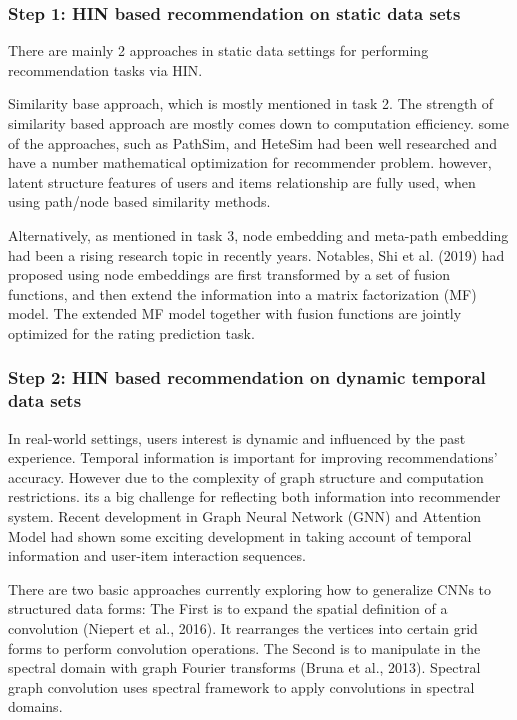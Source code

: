 \documentclass[12pt,a4 paper,title page]{article}
\begin{document}
\subsubsection*{Step 1: HIN based recommendation on static data sets}
There are mainly 2 approaches in static data settings for performing recommendation tasks via HIN. 

Similarity base approach, which is mostly mentioned in task 2. The strength of similarity based approach are mostly comes down to computation efficiency. some of the approaches, such as PathSim, and HeteSim had been well researched and have a number mathematical optimization for recommender problem. however, latent structure features of users and items relationship are fully used, when using path/node based similarity methods.

Alternatively, as mentioned in task 3, node embedding and meta-path embedding had been a rising research topic in recently years. Notables, Shi et al. (2019) had proposed using node embeddings are first transformed by a set of fusion functions, and then extend the information into a matrix factorization (MF) model. The extended MF model together with fusion functions are jointly optimized for the rating prediction task.

\subsubsection*{Step 2: HIN based recommendation on dynamic temporal data sets}
In real-world settings, users interest is dynamic and influenced by the past experience. Temporal information is important for improving recommendations' accuracy. However due to the complexity of graph structure and computation restrictions. its a big challenge for reflecting both information into recommender system. Recent development in Graph Neural Network (GNN) and Attention Model had shown some exciting development in taking account of temporal information and user-item interaction sequences. 

There are two basic approaches currently exploring how to generalize CNNs to structured data forms: 
The First is to expand the spatial definition of a convolution (Niepert et al., 2016). It rearranges the vertices into certain grid forms to perform convolution operations. The Second is to manipulate in the spectral domain with graph Fourier transforms (Bruna et al., 2013). Spectral graph convolution uses spectral framework to apply convolutions in spectral domains.
\end{document}
